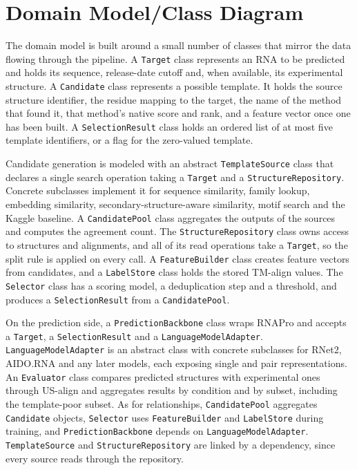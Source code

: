 \documentclass{FastFyp}
\begin{document}
\section{Domain Model/Class Diagram}
The domain model is built around a small number of classes that mirror the data flowing through the pipeline. A \texttt{Target} class represents an RNA to be predicted and holds its sequence, release-date cutoff and, when available, its experimental structure. A \texttt{Candidate} class represents a possible template. It holds the source structure identifier, the residue mapping to the target, the name of the method that found it, that method's native score and rank, and a feature vector once one has been built. A \texttt{SelectionResult} class holds an ordered list of at most five template identifiers, or a flag for the zero-valued template.

Candidate generation is modeled with an abstract \texttt{TemplateSource} class that declares a single search operation taking a \texttt{Target} and a \texttt{StructureRepository}. Concrete subclasses implement it for sequence similarity, family lookup, embedding similarity, secondary-structure-aware similarity, motif search and the Kaggle baseline. A \texttt{CandidatePool} class aggregates the outputs of the sources and computes the agreement count. The \texttt{StructureRepository} class owns access to structures and alignments, and all of its read operations take a \texttt{Target}, so the split rule is applied on every call. A \texttt{FeatureBuilder} class creates feature vectors from candidates, and a \texttt{LabelStore} class holds the stored TM-align values. The \texttt{Selector} class has a scoring model, a deduplication step and a threshold, and produces a \texttt{SelectionResult} from a \texttt{CandidatePool}.

{\sloppy On the prediction side, a \texttt{PredictionBackbone} class wraps RNAPro and accepts a \texttt{Target}, a \texttt{SelectionResult} and a \texttt{LanguageModelAdapter}. \texttt{LanguageModelAdapter} is an abstract class with concrete subclasses for RNet2, AIDO.RNA and any later models, each exposing single and pair representations. An \texttt{Evaluator} class compares predicted structures with experimental ones through US-align and aggregates results by condition and by subset, including the template-poor subset. As for relationships, \texttt{CandidatePool} aggregates \texttt{Candidate} objects, \texttt{Selector} uses \texttt{FeatureBuilder} and \texttt{LabelStore} during training, and \texttt{PredictionBackbone} depends on \texttt{LanguageModelAdapter}. \texttt{TemplateSource} and \texttt{StructureRepository} are linked by a dependency, since every source reads through the repository.\par}
\end{document}
